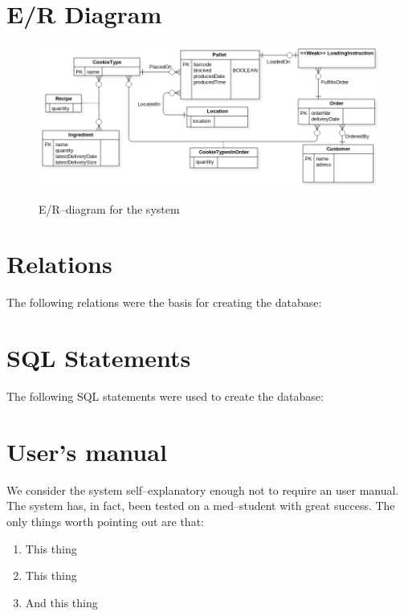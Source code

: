 \documentclass[a4paper]{scrartcl}
\numberwithin{equation}{section}
\begin{document}
\section*{E/R Diagram}

\begin{figure}[h!]
  \begin{centering}
    \includegraphics[width=\textwidth]{../ER.png}
    \label{er-diagram}
    \caption{E/R--diagram for the system}
  \end{centering}
\end{figure}

\section*{Relations}
The following relations were the basis for creating the database:


\section*{SQL Statements}
The following SQL statements were used to create the database:


\section*{User's manual}
We consider the system self--explanatory enough not to require an user manual. 
The system has, in fact, been tested on a med--student with great success.
The only things worth pointing out are that:

\begin{enumerate}
  \item This thing
  \item This thing
  \item And this thing
\end{enumerate}

% 






    

\end{document}

